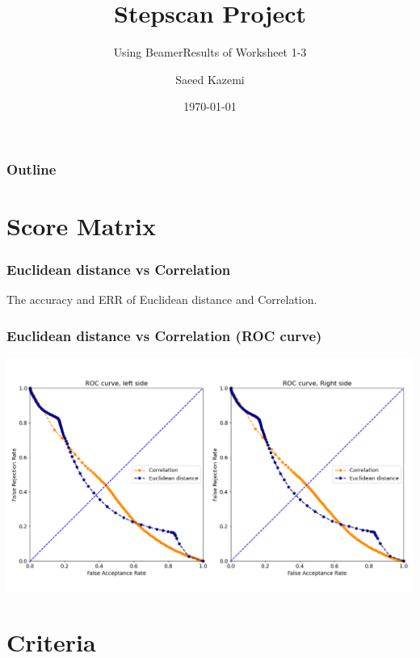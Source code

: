 \documentclass{beamer}
\subtitle{Using Beamer}
\title{ \textbf{Stepscan Project}}
\subtitle{Results of Worksheet 1-3}
\date{\today}
\author{Saeed Kazemi}
\institute{ University of New Brunswick}
\begin{document}
\begin{frame}
\titlepage
\end{frame}


\begin{frame}
\frametitle{Outline}
\tableofcontents
\end{frame}


\section{Score Matrix}

\begin{frame}
\frametitle{Euclidean distance vs Correlation}
\tiny
\begin{table}
\centering
\captionsetup{labelformat=empty}
\caption{\small The accuracy and ERR of Euclidean distance and Correlation.}
\label{tab:parameters condition}

\end{table}
\end{frame}


\begin{frame}
\centering
\frametitle{Euclidean distance vs Correlation (ROC curve)}
\includegraphics[scale=0.3]{Manuscripts/src/figures/Correlation.png}
\end{frame}



\section{Criteria}
\end{document}

